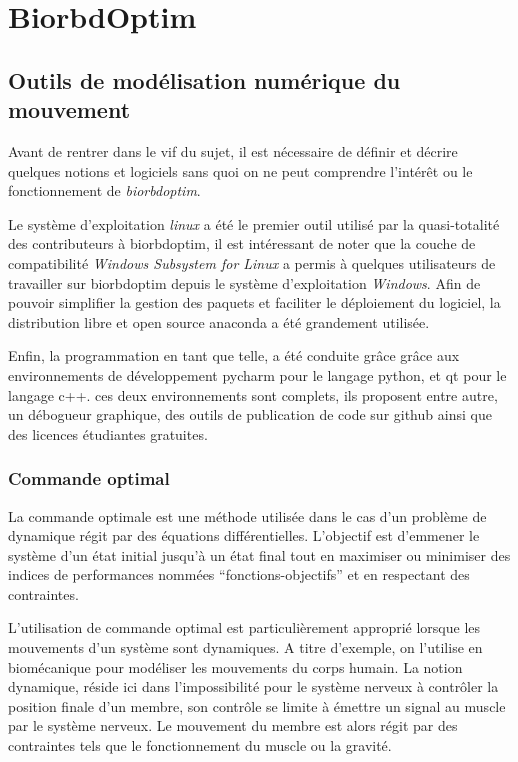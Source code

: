 \part{BiorbdOptim}
    \chapter[Outils de modélisation]{Outils de modélisation numérique du mouvement}
    
    
Avant de rentrer dans le vif du sujet, il est nécessaire de définir et décrire quelques notions et logiciels sans quoi on ne peut comprendre l'intérêt ou le fonctionnement de \emph{\gls{biorbdoptim}}.

Le système d'exploitation \emph{\gls{linux}} a été le premier outil utilisé par la quasi-totalité des contributeurs à \gls{biorbdoptim}, il est intéressant de noter que la couche de compatibilité \emph{Windows Subsystem for Linux} a permis à quelques utilisateurs de travailler sur \gls{biorbdoptim} depuis le système d'exploitation \emph{Windows}. Afin de pouvoir simplifier la gestion des paquets et faciliter le déploiement du logiciel, la distribution libre et open source \gls{anaconda} a été grandement utilisée.

Enfin, la programmation en tant que telle, a été conduite grâce grâce aux environnements de développement \gls{pycharm} pour le langage python, et \gls{qt} pour le langage c++. ces deux environnements sont complets, ils proposent entre autre, un débogueur graphique, des outils de publication de code sur github ainsi que des licences étudiantes gratuites.
\label{pycharm}

        \section{Commande optimal}
        
\label{commande_optimale}
La commande optimale est une méthode utilisée dans le cas d’un problème de dynamique
régit par des équations différentielles. L’objectif est d’emmener le système d’un état initial jusqu’à un état final tout en maximiser ou minimiser des indices de performances nommées ``fonctions-objectifs'' et en respectant des contraintes.

L'utilisation de commande optimal est particulièrement approprié lorsque les mouvements d'un système sont dynamiques. A titre d'exemple, on l'utilise en biomécanique pour modéliser les mouvements du corps humain. La notion dynamique, réside ici dans l'impossibilité pour le système nerveux à contrôler la position finale d'un membre, son contrôle se limite à émettre un signal au muscle par le système nerveux. Le mouvement du membre est alors régit par des contraintes tels que le fonctionnement du muscle ou la gravité. 

